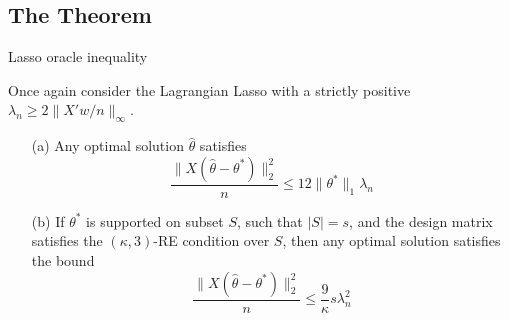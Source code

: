 \documentclass[10pt,handout,english]{beamer}
\begin{document}
\subsection{The Theorem}
\begin{frame}{Lasso oracle inequality}
\begin{theorem}
Once again consider the Lagrangian Lasso with a strictly positive $\lambda_n\geq 2\lVert X'w/n\rVert_{\infty}$.
\begin{itemize}
\item[(a)] Any optimal solution $\hat{\theta}$ satisfies
\[
\frac{\lVert X(\hat{\theta}-\theta^*)\rVert_2^2}{n}\leq 12\lVert \theta^*\rVert_1\lambda_n
\]
\item[(b)] If $\theta^*$ is supported on subset $S$, such that $\lvert S\rvert=s$, and the design matrix satisfies the $(\kappa, 3)$-RE condition over $S$, then any optimal solution satisfies the bound
\[
\frac{\lVert X(\hat{\theta}-\theta^*)\rVert_2^2}{n}\leq \frac{9}{\kappa}s\lambda_n^2
\]
\end{itemize}
\end{theorem}
\end{frame}
\end{document}
